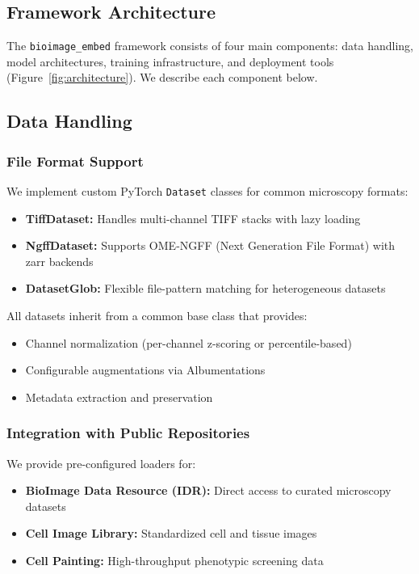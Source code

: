 \subsection{Framework Architecture}

The \texttt{bioimage\_embed} framework consists of four main components: data handling, model architectures, training infrastructure, and deployment tools (Figure~\ref{fig:architecture}). We describe each component below.

\subsection{Data Handling}

\subsubsection{File Format Support}

We implement custom PyTorch \texttt{Dataset} classes for common microscopy formats:

\begin{itemize}
    \item \textbf{TiffDataset:} Handles multi-channel TIFF stacks with lazy loading
    \item \textbf{NgffDataset:} Supports OME-NGFF (Next Generation File Format) with zarr backends
    \item \textbf{DatasetGlob:} Flexible file-pattern matching for heterogeneous datasets
\end{itemize}

All datasets inherit from a common base class that provides:
\begin{itemize}
    \item Channel normalization (per-channel z-scoring or percentile-based)
    \item Configurable augmentations via Albumentations
    \item Metadata extraction and preservation
\end{itemize}

\subsubsection{Integration with Public Repositories}

We provide pre-configured loaders for:
\begin{itemize}
    \item \textbf{BioImage Data Resource (IDR):} Direct access to curated microscopy datasets
    \item \textbf{Cell Image Library:} Standardized cell and tissue images
    \item \textbf{Cell Painting:} High-throughput phenotypic screening data
\end{itemize}

